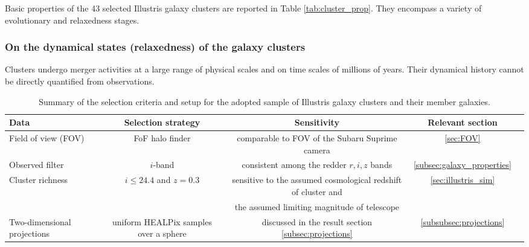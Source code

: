 \documentclass[usenatbib]{mn2e}
\begin{document}
{Basic properties of the 43 selected Illustris galaxy clusters are reported in Table \ref{tab:cluster_prop}. 
They encompass a variety of evolutionary and relaxedness stages.

\subsubsection{On the dynamical states (relaxedness) of the galaxy clusters}
\label{subsubsec:relaxedness}

Clusters undergo merger activities at a large range of physical scales and 
on time scales of millions of years. Their dynamical history cannot be directly 
quantified from observations. 

\begin{table*}
\begin{center}
	\caption{Summary of the selection criteria and setup for the adopted sample of Illustris galaxy clusters and their member galaxies.
\label{tab:member_galaxy_selections}} 

\begin{tabular}{@{}lcccc@{}}
\hline 
Data &  Selection strategy  & Sensitivity & Relevant section  \\ \hline
Field of view (FOV) & FoF halo finder& comparable to FOV of the Subaru
Suprime camera & \ref{sec:FOV}  \\ 
Observed filter & $i$-band & consistent among the redder $r, i, z$ bands &   
\ref{subsec:galaxy_properties}
\\ 
Cluster richness  & $i \leq 24.4$ and $z = 0.3$  & sensitive to
the assumed cosmological redshift of cluster and & \ref{sec:illustris_sim} \\ 
& & the assumed limiting magnitude of telescope &   \\
Two-dimensional projections & uniform HEALPix samples over a sphere &
discussed in the result section \ref{subsec:projections} & \ref{subsubsec:projections}\\  
\hline
\end{tabular}
\end{center} 
\end{table*}

}
\end{document}
